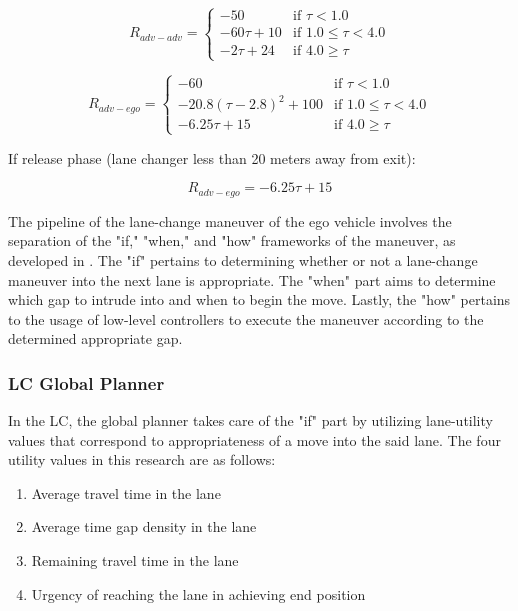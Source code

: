 \documentclass[12pt, a4paper]{report}
\begin{document}
\begin{equation}
R_{adv-adv} = \begin{cases}
-50 & \text{if } \tau < 1.0 \\
-60\tau + 10 & \text{if } 1.0 \leq \tau < 4.0 \\
-2\tau + 24 & \text{if } 4.0 \geq \tau 
\end{cases}
\end{equation}

\begin{equation}
R_{adv-ego} = \begin{cases}
-60 & \text{if } \tau < 1.0 \\
-20.8(\tau - 2.8)^2 + 100 & \text{if } 1.0 \leq \tau < 4.0 \\
-6.25\tau + 15 & \text{if } 4.0 \geq \tau 
\end{cases}
\end{equation}

If release phase (lane changer less than 20 meters away from exit):

\begin{equation}
R_{adv-ego} = -6.25 \tau + 15 
\end{equation}

The pipeline of the lane-change maneuver of the ego vehicle involves the separation of the "if," "when," and "how" frameworks of the maneuver, as developed in \cite{7637091}. The "if" pertains to determining whether or not a lane-change maneuver into the next lane is appropriate. The "when" part aims to determine which gap to intrude into and when to begin the move. Lastly, the "how" pertains to the usage of low-level controllers to execute the maneuver according to the determined appropriate gap.

\subsubsection{LC Global Planner}
In the LC, the global planner takes care of the "if" part by utilizing lane-utility values that correspond to appropriateness of a move into the said lane. The four utility values in this research are as follows:
\begin{enumerate}
    \item Average travel time in the lane
    \item Average time gap density in the lane
    \item Remaining travel time in the lane
    \item Urgency of reaching the lane in achieving end position
\end{enumerate}
\end{document}
